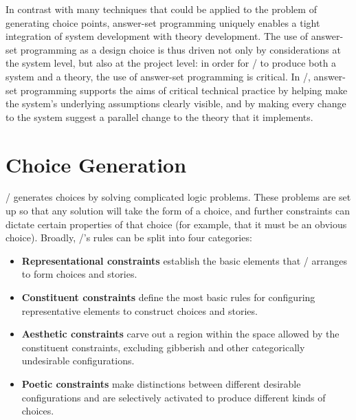 In contrast with many techniques that could be applied to the problem of generating choice points, answer-set programming uniquely enables a tight integration of system development with theory development.
%
The use of answer-set programming as a design choice is thus driven not only by considerations at the system level, but also at the project level: in order for \dunyazad/ to produce both a system and a theory, the use of answer-set programming is critical.
%
In \dunyazad/, answer-set programming supports the aims of critical technical practice by helping make the system's underlying assumptions clearly visible, and by making every change to the system suggest a parallel change to the theory that it implements.

%


\section{Choice Generation}
\label{sec:dunyazad-choice-generation}%

\dunyazad/ generates choices by solving complicated logic problems.
%
These problems are set up so that any solution will take the form of a choice, and further constraints can dictate certain properties of that choice (for example, that it must be an obvious choice).
%
Broadly, \dunyazad/'s rules can be split into four categories:

\begin{itemize}
\item \textbf{Representational constraints} establish the basic elements that \dunyazad/ arranges to form choices and stories.
\item \textbf{Constituent constraints} define the most basic rules for configuring representative elements to construct choices and stories.
\item \textbf{Aesthetic constraints} carve out a region within the space allowed by the constituent constraints, excluding gibberish and other categorically undesirable configurations.
\item \textbf{Poetic constraints} make distinctions between different desirable configurations and are selectively activated to produce different kinds of choices.
\end{itemize}

